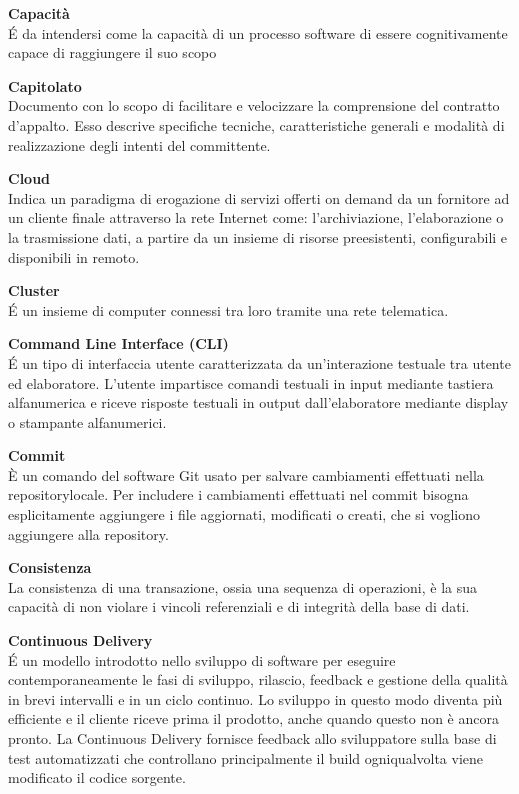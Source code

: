 \documentclass[a4paper, oneside, openany, dvipsnames, table, 12pt]{article}
\begin{document}
\textbf{Capacità} \\
\'E da intendersi come la capacità di un processo software di essere cognitivamente capace di raggiungere il suo scopo

\textbf{Capitolato}\\	
Documento con lo scopo di facilitare e velocizzare la comprensione del contratto d'appalto. Esso descrive specifiche tecniche, caratteristiche generali e modalità di realizzazione degli intenti del committente.

\textbf{Cloud} \\
Indica un paradigma di erogazione di servizi offerti on demand da un fornitore ad un cliente finale attraverso la rete Internet come: l'archiviazione, l'elaborazione o la trasmissione dati, a partire da un insieme di risorse preesistenti, configurabili e disponibili in remoto.

\textbf{Cluster} \\
\'E un insieme di computer connessi tra loro tramite una rete telematica.

\textbf{Command Line Interface (CLI)} \\
\'E un tipo di interfaccia utente caratterizzata da un'interazione testuale tra utente ed elaboratore. L'utente impartisce comandi testuali in input mediante tastiera alfanumerica e riceve risposte testuali in output dall'elaboratore mediante display o stampante alfanumerici. 

\textbf{Commit} \\
È un comando del software Git usato per salvare cambiamenti effettuati nella repository\glo locale. Per includere i cambiamenti effettuati nel commit bisogna esplicitamente aggiungere i file aggiornati, modificati o creati, che si vogliono aggiungere alla repository.

\textbf{Consistenza} \\
La consistenza di una transazione, ossia una sequenza di operazioni, è la sua capacità di non violare i vincoli referenziali e di integrità della base di dati.

\textbf{Continuous Delivery} \\
\'E un modello introdotto nello sviluppo di software per eseguire contemporaneamente le fasi di sviluppo, rilascio, feedback e gestione della qualità in brevi intervalli e in un ciclo continuo. Lo sviluppo in questo modo diventa più efficiente e il cliente riceve prima il prodotto, anche quando questo non è ancora pronto. La Continuous Delivery fornisce feedback allo sviluppatore sulla base di test automatizzati che controllano principalmente il build ogniqualvolta viene modificato il codice sorgente.
\end{document}
